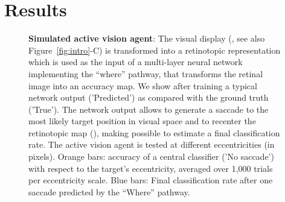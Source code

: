 \section{Results}
\label{sec:results}
\begin{figure}[t!]%
\caption{
{\bf Simulated active vision agent}:
\A The visual display (\DIS , see also Figure~\ref{fig:intro}-C) is transformed into a retinotopic representation which is used as the input of a multi-layer neural network implementing the ``where'' pathway, that transforms the retinal image into an accuracy map. %
\B We show after training a typical network output ('Predicted') as compared with the ground truth ('True'). %
\C The network output allows to generate a saccade to the most likely target position in visual space and to recenter the retinotopic map (\SAC ), making possible to estimate a final classification rate. %
\D The active vision agent is tested at different eccentricities (in pixels). Orange bars: accuracy of a central classifier ('No saccade') with respect to the target's eccentricity, averaged over 1,000 trials per eccentricity scale. Blue bars: Final classification rate after one saccade predicted by the ``Where'' pathway. \fi
\label{fig:results}}%
\end{figure}%
\ICANN
\else
